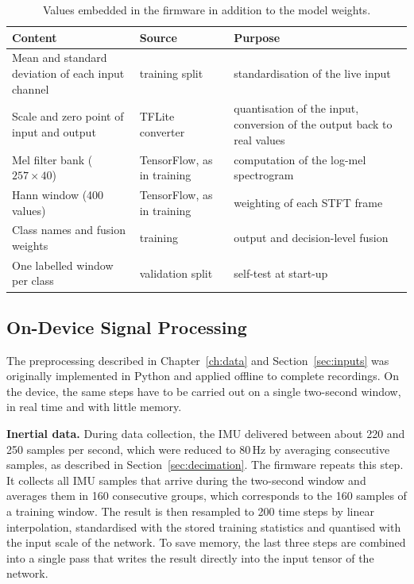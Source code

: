 \begin{table}[htbp]
\centering
\small
\renewcommand{\arraystretch}{1.2}
\begin{tabularx}{\textwidth}{|p{4.6cm}|p{3.6cm}|X|}
\hline
\textbf{Content} & \textbf{Source} & \textbf{Purpose} \\
\hline
Mean and standard deviation of each input channel & training split & standardisation of the live input \\
Scale and zero point of input and output & TFLite converter & quantisation of the input, conversion of the output back to real values \\
Mel filter bank ($257 \times 40$) & TensorFlow, as in training & computation of the log-mel spectrogram \\
Hann window (400 values) & TensorFlow, as in training & weighting of each STFT frame \\
Class names and fusion weights & training & output and decision-level fusion \\
One labelled window per class & validation split & self-test at start-up \\
\hline
\end{tabularx}
\caption{Values embedded in the firmware in addition to the model weights.}
\label{tab:firmware-contents}
\end{table}

\subsection{On-Device Signal Processing}
\label{sec:device-preprocessing}

The preprocessing described in Chapter~\ref{ch:data} and
Section~\ref{sec:inputs} was originally implemented in Python and applied offline
to complete recordings. On the device, the same steps have to be carried out on a
single two-second window, in real time and with little memory.

\textbf{Inertial data.} During data collection, the IMU delivered between
about 220 and 250 samples per second, which were reduced to 80\,Hz by averaging consecutive samples,
as described in Section~\ref{sec:decimation}. The firmware repeats this step. It
collects all IMU samples that arrive during the two-second window and averages
them in 160 consecutive groups, which corresponds to the 160 samples of a training
window. The result is then resampled to 200 time steps by linear interpolation,
standardised with the stored training statistics and quantised with the input
scale of the network. To save memory, the last three steps are combined into a
single pass that writes the result directly into the input tensor of the network.

